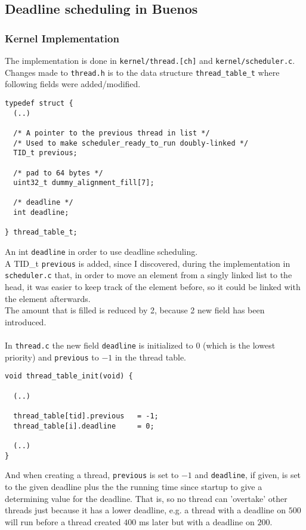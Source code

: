 \documentclass[12pt]{article}
\begin{document}
\subsection{Deadline scheduling in Buenos}


\subsubsection{Kernel Implementation}
The implementation is done in \texttt{kernel/thread.[ch]} and \texttt{kernel/scheduler.c}.\\
Changes made to \texttt{thread.h} is to the data structure \texttt{thread\_table\_t} where following fields were added/modified.
\begin{verbatim}
typedef struct {
  (..)
  
  /* A pointer to the previous thread in list */
  /* Used to make scheduler_ready_to_run doubly-linked */
  TID_t previous;    

  /* pad to 64 bytes */
  uint32_t dummy_alignment_fill[7];
  
  /* deadline */
  int deadline;
  
} thread_table_t;
\end{verbatim}
An int \texttt{deadline} in order to use deadline scheduling.\\
A TID\_t \texttt{previous} is added, since I discovered, during the implementation in \texttt{scheduler.c} that, in order to move an element from a singly linked list to the head, it was easier to keep track of the element before, so it could be linked with the element afterwards.\\
The amount that is filled is reduced by 2, because 2 new field has been introduced.\\
\\
In \texttt{thread.c} the new field \texttt{deadline} is initialized to $0$ (which is the lowest priority) and \texttt{previous} to $-1$ in the thread table.
\begin{verbatim}
void thread_table_init(void) {

  (..)
  
  thread_table[tid].previous   = -1;
  thread_table[i].deadline     = 0;
  
  (..)
}
\end{verbatim}
And when creating a thread, \texttt{previous} is set to $-1$ and \texttt{deadline}, if given, is set to the given deadline plus the the running time since startup to give a determining value for the deadline. That is, so no thread can 'overtake' other threads just because it has a lower deadline, e.g. a thread with a deadline on $500$ will run before a thread created $400$ ms later but with a deadline on $200$.\\
\end{document}
